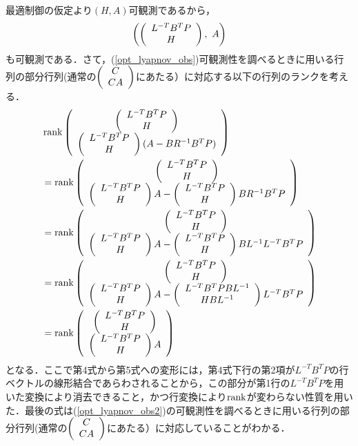 最適制御の仮定より$(H,A)$可観測であるから，
\begin{align}
	\left( \bmatrix{c} L^{-T} B^T P \\ H \ematrix, \ A \right)
\label{opt_lyapnov_obs2}
\end{align}
も可観測である．さて，(\ref{opt_lyapnov_obs})可観測性を調べるときに用いる行列の部分行列(通常の$\bmatrix{c} C \\CA \ematrix$にあたる）に対応する以下の行列のランクを考える．
\begin{align}
	&\rank \bmatrix{c} \bmatrix{c} L^{-T} B^T P \\ H \ematrix \\
                            \bmatrix{c} L^{-T} B^T P \\ H \ematrix (A - B R^{-1} B^T P)
               \ematrix
\nonumber \\
	&=
	\rank \bmatrix{c} \bmatrix{c} L^{-T} B^T P \\ H \ematrix \\
                            \bmatrix{c} L^{-T} B^T P \\ H \ematrix A
                          - \bmatrix{c} L^{-T} B^T P \\ H \ematrix B R^{-1} B^T P
               \ematrix
\nonumber \\
	&=
	\rank \bmatrix{c} \bmatrix{c} L^{-T} B^T P \\ H \ematrix \\
                            \bmatrix{c} L^{-T} B^T P \\ H \ematrix A
                          - \bmatrix{c} L^{-T} B^T P \\ H \ematrix B L^{-1} L^{-T} B^T P
               \ematrix
\nonumber \\
	&=
	\rank \bmatrix{c} \bmatrix{c} L^{-T} B^T P \\ H \ematrix \\
                            \bmatrix{c} L^{-T} B^T P \\ H \ematrix A
                          - \bmatrix{c} L^{-T} B^T P B L^{-1}\\ H B L^{-1}\ematrix  L^{-T} B^T P
               \ematrix
\nonumber \\
	&=
	\rank \bmatrix{c} \bmatrix{c} L^{-T} B^T P \\ 
                                      H 
                          \ematrix \\
                          \bmatrix{c} L^{-T} B^T P \\ 
                                      H
                          \ematrix A
                    \ematrix
\end{align}
となる．ここで第4式から第5式への変形には，第4式下行の第2項が$L^{-T} B^T P$の行ベクトルの線形結合であらわされることから，この部分が第1行の$L^{-T} B^T P$を用いた変換により消去できること，かつ行変換により$\rank$が変わらない性質を用いた．最後の式は(\ref{opt_lyapnov_obs2})の可観測性を調べるときに用いる行列の部分行列(通常の$\bmatrix{c} C \\CA \ematrix$にあたる）に対応していることがわかる．

